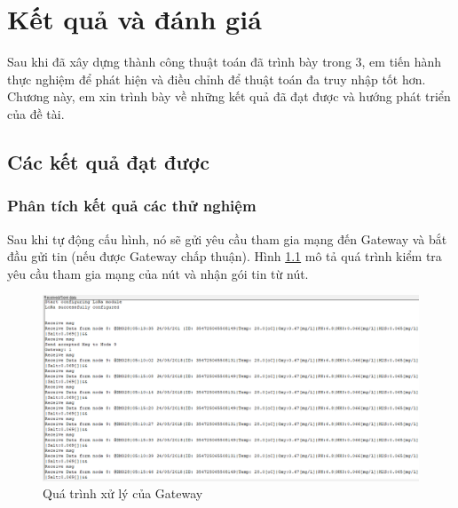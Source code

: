 \chapter{Kết quả và đánh giá}
\label{chapter4}
Sau khi đã xây dựng thành công thuật toán đã trình bày trong 3, em tiến hành thực nghiệm để phát hiện và điều chỉnh để thuật toán đa truy nhập tốt hơn. Chương này, em xin trình bày về những kết quả đã đạt được và hướng phát triển của đề tài.
\section{Các kết quả đạt được}
\subsection{Phân tích kết quả các thử nghiệm}
Sau khi tự động cấu hình, nó sẽ gửi yêu cầu tham gia mạng đến Gateway và bắt đầu gửi tin (nếu được Gateway chấp thuận). Hình \ref{receivePacket} mô tả quá trình kiểm tra yêu cầu tham gia mạng của nút và nhận gói tin từ nút.
\begin{figure}[h]
\centering
\includegraphics[scale=0.4]{image/receivePacket}
\caption{Quá trình xử lý của Gateway}
\label{receivePacket}
\end{figure}
